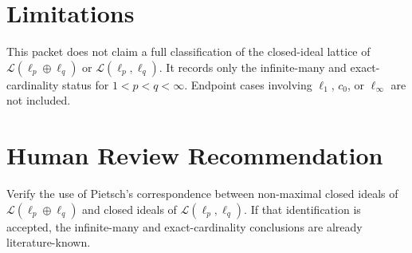 \documentclass[11pt]{article}
\newcommand{\cL}{\mathcal L}
\begin{document}
\section*{Limitations}

This packet does not claim a full classification of the closed-ideal lattice
of \(\cL(\ell_p\oplus\ell_q)\) or \(\cL(\ell_p,\ell_q)\).  It records only
the infinite-many and exact-cardinality status for \(1<p<q<\infty\).  Endpoint
cases involving \(\ell_1\), \(c_0\), or \(\ell_\infty\) are not included.

\section*{Human Review Recommendation}

Verify the use of Pietsch's correspondence between non-maximal closed ideals
of \(\cL(\ell_p\oplus\ell_q)\) and closed ideals of
\(\cL(\ell_p,\ell_q)\).  If that identification is accepted, the
infinite-many and exact-cardinality conclusions are already literature-known.
\end{document}
